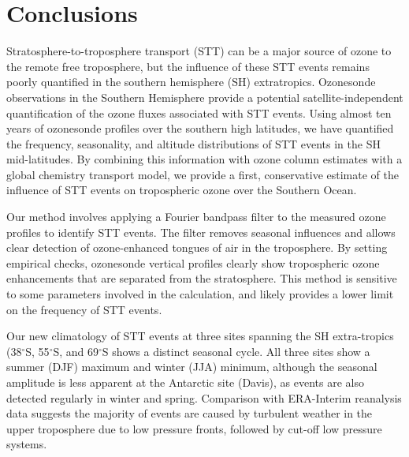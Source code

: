 \documentclass{article}
\begin{document}
  
  
\section{Conclusions}
  
  Stratosphere-to-troposphere transport (STT) can be a major source of ozone to the remote free troposphere, but the influence of these STT events remains poorly quantified in the southern hemisphere (SH) extratropics.
  Ozonesonde observations in the Southern Hemisphere provide a potential satellite-independent quantification of the ozone fluxes associated with STT events.
  Using almost ten years of ozonesonde profiles over the southern high latitudes, we have quantified the frequency, seasonality, and altitude distributions of STT events in the SH mid-latitudes. 
  By combining this information with ozone column estimates with a global chemistry transport model, we provide a first, conservative estimate of the influence of STT events on tropospheric ozone over the Southern Ocean.
  
  
  Our method involves applying a Fourier bandpass filter to the measured ozone profiles to identify STT events.
  The filter removes seasonal influences and allows clear detection of ozone-enhanced tongues of air in the troposphere.
  By setting empirical checks, ozonesonde vertical profiles clearly show tropospheric ozone enhancements that are separated from the stratosphere.
  This method is sensitive to some parameters involved in the calculation, and likely provides a lower limit on the frequency of STT events.%
  
  Our new climatology of STT events at three sites spanning the SH extra-tropics (38$^{\circ}$S, 55$^{\circ}$S, and 69$^{\circ}$S shows a distinct seasonal cycle.
  All three sites show a summer (DJF) maximum and winter (JJA) minimum, although the seasonal amplitude is less apparent at the Antarctic site (Davis), as events are also detected regularly in winter and spring.  %
  Comparison with ERA-Interim reanalysis data suggests the majority of events are caused by turbulent weather in the upper troposphere due to low pressure fronts, followed by cut-off low pressure systems.
\end{document}
